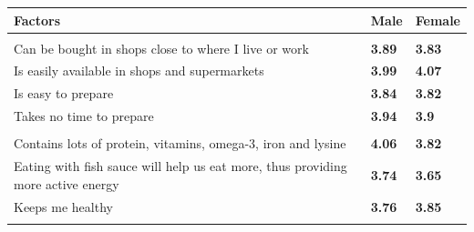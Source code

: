 \documentclass[]{article}
\begin{document}
\begin{tabular}{lll}
\toprule
\textbf{Factors} & \textbf{Male} & \textbf{Female}\\
\midrule
\addlinespace[0.3em]
\multicolumn{3}{l}{\textbf{Convenience}}\\
\hspace{1em}Can be bought in shops close to where I live or work & \bgroup\fontsize{13}{15}\selectfont \textcolor[HTML]{23A983}{\textbf{3.89}}\egroup{} & \bgroup\fontsize{13}{15}\selectfont \textcolor[HTML]{1F958B}{\textbf{3.83}}\egroup{}\\
\hspace{1em}Is easily available in shops and supermarkets & \bgroup\fontsize{14}{16}\selectfont \textcolor[HTML]{3EBC73}{\textbf{3.99}}\egroup{} & \bgroup\fontsize{15}{17}\selectfont \textcolor[HTML]{5CC863}{\textbf{4.07}}\egroup{}\\
\hspace{1em}Is easy to prepare & \bgroup\fontsize{13}{15}\selectfont \textcolor[HTML]{1F9F88}{\textbf{3.84}}\egroup{} & \bgroup\fontsize{13}{15}\selectfont \textcolor[HTML]{20928C}{\textbf{3.82}}\egroup{}\\
\hspace{1em}Takes no time to prepare & \bgroup\fontsize{14}{16}\selectfont \textcolor[HTML]{2EB37C}{\textbf{3.94}}\egroup{} & \bgroup\fontsize{13}{15}\selectfont \textcolor[HTML]{20A486}{\textbf{3.9}}\egroup{}\\
\addlinespace[0.3em]
\multicolumn{3}{l}{\textbf{Health}}\\
\hspace{1em}Contains lots of protein, vitamins, omega-3, iron and lysine & \bgroup\fontsize{15}{17}\selectfont \textcolor[HTML]{5CC863}{\textbf{4.06}}\egroup{} & \bgroup\fontsize{13}{15}\selectfont \textcolor[HTML]{20928C}{\textbf{3.82}}\egroup{}\\
\hspace{1em}Eating with fish sauce will help us eat more, thus providing more active energy & \bgroup\fontsize{12}{14}\selectfont \textcolor[HTML]{238B8D}{\textbf{3.74}}\egroup{} & \bgroup\fontsize{11}{13}\selectfont \textcolor[HTML]{2F6C8E}{\textbf{3.65}}\egroup{}\\
\hspace{1em}Keeps me healthy & \bgroup\fontsize{12}{14}\selectfont \textcolor[HTML]{218F8D}{\textbf{3.76}}\egroup{} & \bgroup\fontsize{13}{15}\selectfont \textcolor[HTML]{1F9A8A}{\textbf{3.85}}\egroup{}\\
\addlinespace[0.3em]
\multicolumn{3}{l}{\textbf{Price}}\\

\end{tabular}
\end{document}
